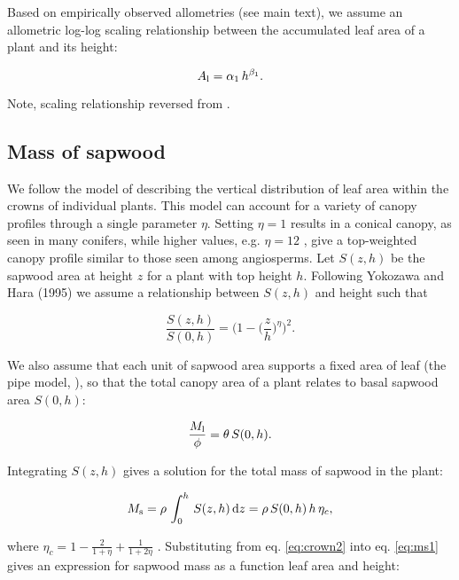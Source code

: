 \documentclass[a4paper,11pt]{article}
\begin{document}
\begin{appendices}
Based on empirically observed allometries (see main text), we assume an
allometric log-log scaling relationship between the accumulated leaf
area of a plant and its height:

\begin{equation}\label{eq:ha}
A_{\rm l}=\alpha_1 \, h^{\beta_1}.
\end{equation}

Note, scaling relationship reversed from \citep{Falster-2011}.

\subsection{Mass of sapwood}\label{mass-of-sapwood}

We follow the model of \citep{Yokozawa-1995} describing the
vertical distribution of leaf area within the crowns of individual
plants. This model can account for a variety of canopy profiles through
a single parameter $\eta$. Setting $\eta=1$ results in a conical
canopy, as seen in many conifers, while higher values, e.g. $\eta=12$
, give a top-weighted canopy profile similar to those seen among
angiosperms. Let $S(z,h)$ be the sapwood area at height $z$ for a
plant with top height $h$. Following Yokozawa and Hara (1995) we
assume a relationship between $S(z,h)$ and height such that

\begin{equation}\label{eq:crown1}
\frac{S(z,h)}{S(0,h)}= \big(1-\big(\frac{z}{h}\big)^\eta\big)^2.
\end{equation}

We also assume that each unit of sapwood area supports a fixed area of
leaf (the pipe model, \citep{Shinozaki-1964}), so that the total
canopy area of a plant relates to basal sapwood area $S(0,h)$:

\begin{equation}\label{eq:crown2}
\frac{M_{\rm l}}{\phi}= \theta \, S(0,h).
\end{equation}

Integrating $S(z,h)$ gives a solution for the total mass of sapwood in
the plant:

\begin{equation}\label{eq:ms1}
M_\textrm{s}=\rho \, \int_0^h \, S(z,h) \, {\rm d}z= \rho \, S(0,h) \, h \, \eta_c, \end{equation}

where
$\eta_c=1-\frac{2}{1+\eta} + \frac{1}{1+2\eta}$ \citep{Yokozawa-1995}.
Substituting from eq. \ref{eq:crown2} into eq. \ref{eq:ms1} gives an
expression for sapwood mass as a function leaf area and height:


\end{appendices}
\end{document}

